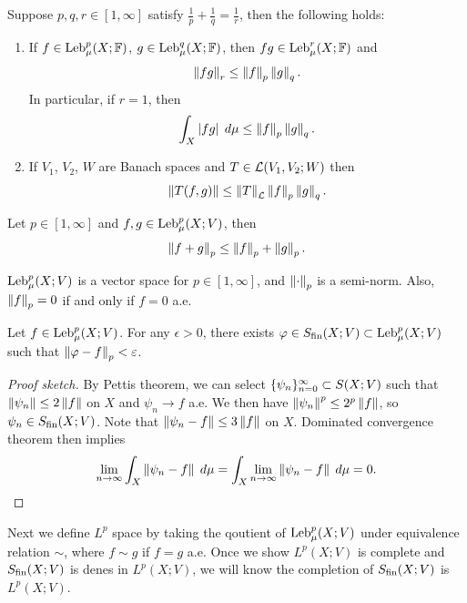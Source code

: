 \documentclass[a4paper]{article}
\begin{document}
\begin{thm}
Suppose $p, q, r \in [1, \infty]$ satisfy $\frac{1}{p} + \frac{1}{q}
= \frac{1}{r}$, then the following holds:
\begin{enumerate}
\item If $f \in \operatorname{Leb}_\mu^p(X; \mathbb{F})$, $g \in \operatorname{Leb}_\mu^q (X; \mathbb{F})$,
then $f g \in \operatorname{Leb}_\mu^r (X; \mathbb{F})$ and
\[
\left\lVert f g\right\rVert_r \leq \left\lVert f\right\rVert_p \left\lVert g\right\rVert_q.
\]
In particular, if $r = 1$, then
\[
\int_X \left\lvert f g\right\rvert \; d \mu \leq \left\lVert f\right\rVert_p \left\lVert g\right\rVert_q.
\]

\item If $V_1$, $V_2$, $W$ are Banach spaces and
$T \in \mathcal{L}(V_1, V_2 ; W)$ then
\[
\left\lVert T (f, g)\right\rVert \leq \left\lVert T\right\rVert_{\mathcal{L}} \left\lVert f\right\rVert_p \left\lVert g\right\rVert_q.
\]
\end{enumerate}
\end{thm}


\begin{thm}
Let $p \in [1, \infty]$ and $f, g \in \operatorname{Leb}_\mu^p(X ; V)$, then
\[
\left\lVert f + g\right\rVert_p \leq \left\lVert f\right\rVert_p + \left\lVert g\right\rVert_p.
\]
\end{thm}

\begin{cor}
$\operatorname{Leb}_\mu^p(X; V)$ is a vector space for $p \in [1, \infty]$,
and $\left\lVert \cdot\right\rVert_p$ is a semi-norm. Also,
$\left\lVert f\right\rVert_p = 0$ if and only if $f = 0$ a.e.
\end{cor}

\begin{thm}
Let $f \in \operatorname{Leb}_\mu^p (X; V)$. For any $\epsilon > 0$,
there exists $\varphi \in S_{\text{fin}}(X; V) \subset \operatorname{Leb}_\mu^p (X; V)$
such that $\left\lVert \varphi - f\right\rVert_p < \varepsilon$.
\end{thm}

\begin{proof}[Proof sketch]
By Pettis theorem, we can select $\{ \psi_n \}_{n=0}^\infty \subset
S(X; V)$ such that $\left\lVert \psi_n\right\rVert \leq 2 \left\lVert f\right\rVert$
on $X$ and $\psi_n \to f$ a.e. We then have
$\left\lVert \psi_n\right\rVert^p \leq 2^p \left\lVert f\right\rVert$, so $\psi_n
\in S_{\text{fin}}(X ; V)$. Note that $\left\lVert \psi_n - f\right\rVert \leq
3 \left\lVert f\right\rVert$ on $X$. Dominated convergence theorem then implies
\[
\lim_{n \to \infty} \int_X \left\lVert \psi_n - f\right\rVert \; d \mu
= \int_X \lim_{n \to \infty} \left\lVert \psi_n - f\right\rVert \; d \mu
= 0.
\]
\end{proof}

Next we define $L^p$ space by taking the qoutient of
$\operatorname{Leb}_\mu^p (X; V)$ under equivalence relation $\sim$,
where $f \sim g$ if $f = g$ a.e. Once we show
$L^p(X; V)$ is complete and $S_{\text{fin}}(X; V)$ is denes in
$L^p(X; V)$, we will know the completion of
$S_{\text{fin}}(X; V)$ is $L^p(X; V)$.
\end{document}
